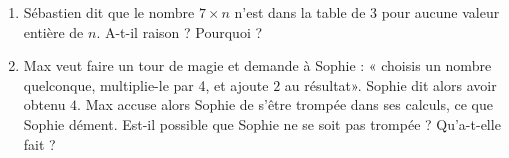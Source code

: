
\begin{exercice}\label{exo2smath-0099}

    \begin{enumerate}
        \item
            
    Sébastien dit que le nombre \( 7\times n\) n'est dans la table de \( 3\) pour aucune valeur entière de \( n\). A-t-il raison ? Pourquoi ?

\item

    Max veut faire un tour de magie et demande à Sophie : « choisis un nombre quelconque, multiplie-le par 4, et ajoute \( 2\) au résultat». Sophie dit alors avoir obtenu \( 4\). Max accuse alors Sophie de s'être trompée dans ses calculs, ce que Sophie dément. Est-il possible que Sophie ne se soit pas trompée ? Qu'a-t-elle fait ?
    
    \end{enumerate}

\end{exercice}
